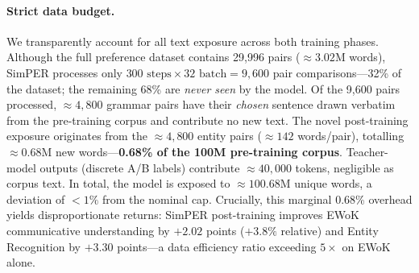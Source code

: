 \documentclass[11pt]{article}
\begin{document}
\paragraph{Strict data budget.}
We transparently account for all text exposure across both training phases.
Although the full preference dataset contains 29{,}996 pairs
(${\approx}3.02$M words), SimPER processes only
$300\text{ steps}\times 32\text{ batch}=9{,}600$ pair
comparisons---32\% of the dataset; the remaining 68\% are
\emph{never seen} by the model.
Of the 9{,}600 pairs processed, ${\approx}4{,}800$ grammar pairs
have their \emph{chosen} sentence drawn verbatim from the
pre-training corpus and contribute no new text.
The novel post-training exposure originates from the
${\approx}4{,}800$ entity pairs (${\approx}142$ words/pair),
totalling ${\approx}0.68$M new words---\textbf{0.68\% of the
100M pre-training corpus}.
Teacher-model outputs (discrete A/B labels) contribute
${\approx}40{,}000$ tokens, negligible as corpus text.
In total, the model is exposed to ${\approx}100.68$M unique words,
a deviation of ${<}1\%$ from the nominal cap.
Crucially, this marginal 0.68\% overhead yields disproportionate
returns: SimPER post-training improves EWoK communicative
understanding by $+2.02$ points ($+3.8\%$ relative) and
Entity Recognition by $+3.30$ points---a data efficiency ratio
exceeding $5{\times}$ on EWoK alone.

\begin{table}[t]
\centering
\small
\setlength{\tabcolsep}{4pt}
\caption{Preference pair distribution.
Grammar pairs are constructed by rule-based substitution on pre-training text.
Entity pairs are generated programmatically from closed-vocabulary templates.}
\label{tab:pairs}
\end{table}
\end{document}
